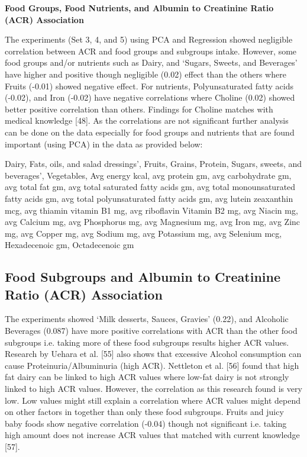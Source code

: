 \noindent \textbf{Food Groups, Food Nutrients, and Albumin to Creatinine Ratio (ACR) Association}

\noindent The experiments (Set 3, 4, and 5) using PCA and Regression showed negligible correlation between ACR and food groups and subgroups intake. However, some food groups and/or nutrients such as Dairy, and  `Sugars, Sweets, and Beverages'  have higher and positive though negligible (0.02) effect than the others where Fruits (-0.01) showed negative effect.  For nutrients, Polyunsaturated fatty acids (-0.02), and Iron (-0.02) have negative correlations where Choline (0.02) showed better positive correlation than others. Findings for Choline matches with medical knowledge [48]. As the correlations are not significant further analysis can be done on the data especially for food groups and nutrients that are found important (using PCA) in the data as provided below:

\noindent Dairy,  Fats, oils, and salad dressings’,  Fruits,  Grains,  Protein,   Sugars, sweets, and beverages’, Vegetables, Avg energy kcal,  avg protein gm,  avg carbohydrate gm,  avg total fat gm,  avg total saturated fatty acids gm, avg total monounsaturated fatty acids gm,  avg total polyunsaturated fatty acids gm, avg lutein zeaxanthin mcg,  avg thiamin vitamin B1 mg,  avg riboflavin Vitamin B2 mg,  avg Niacin mg, avg Calcium mg,  avg Phosphorus mg,  avg Magnesium mg,  avg Iron mg, avg Zinc mg,  avg Copper mg,  avg Sodium mg,  avg Potassium mg,  avg Selenium mcg,  Hexadecenoic gm,  Octadecenoic gm

\subsection{Food Subgroups and Albumin to Creatinine Ratio (ACR) Association}

\noindent The experiments showed  `Milk desserts, Sauces, Gravies' (0.22), and Alcoholic Beverages (0.087) have more positive correlations with ACR than the other food subgroups  i.e. taking more of these food subgroups results higher ACR values. Research by Uehara et al. [55] also shows that excessive Alcohol consumption can cause Proteinuria/Albuminuria (high ACR). Nettleton et al. [56] found that high fat dairy can be linked to high ACR values where low-fat dairy is not strongly linked to high ACR values. However, the correlation as this research found is very low. Low values might still explain a correlation where ACR values might depend on other factors in together than only these food subgroups. Fruits and juicy baby foods show negative correlation (-0.04) though not significant i.e. taking high amount does not increase ACR values that matched with current knowledge [57].